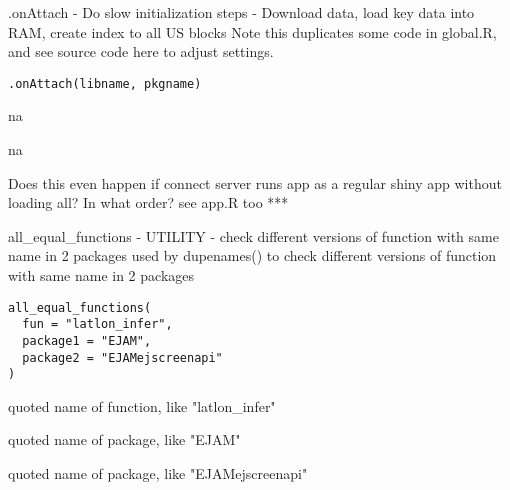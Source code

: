 \documentclass[a4paper]{book}
\begin{document}
%
\begin{Description}\relax
.onAttach - Do slow initialization steps - Download data, load key data into RAM, create index to all US blocks
Note this duplicates some code in global.R, and see source code here to adjust settings.
\end{Description}
%
\begin{Usage}
\begin{verbatim}
.onAttach(libname, pkgname)
\end{verbatim}
\end{Usage}
%
\begin{Arguments}
\begin{ldescription}
\item[\code{libname}] na

\item[\code{pkgname}] na
\end{ldescription}
\end{Arguments}
%
\begin{Details}\relax
Does this even happen if connect server runs app as a regular shiny app without loading all?
In what order? see app.R too ***
\end{Details}
%
\begin{Description}\relax
all\_equal\_functions - UTILITY - check different versions of function with same name in 2 packages
used by dupenames() to check different versions of function with same name in 2 packages
\end{Description}
%
\begin{Usage}
\begin{verbatim}
all_equal_functions(
  fun = "latlon_infer",
  package1 = "EJAM",
  package2 = "EJAMejscreenapi"
)
\end{verbatim}
\end{Usage}
%
\begin{Arguments}
\begin{ldescription}
\item[\code{fun}] quoted name of function, like "latlon\_infer"

\item[\code{package1}] quoted name of package, like "EJAM"

\item[\code{package2}] quoted name of package, like "EJAMejscreenapi"
\end{ldescription}
\end{Arguments}
\end{document}
